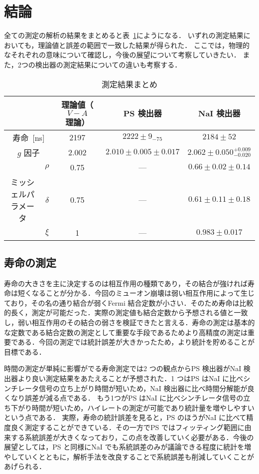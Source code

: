 \section{結論}
全ての測定の解析の結果をまとめると表~\ref{tab:result_conclusion}にようになる．
いずれの測定結果においても，理論値と誤差の範囲で一致した結果が得られた．
ここでは，物理的なそれぞれの意味について確認し，今後の展望について考察していきたい．
また，2つの検出器の測定結果についての違いも考察する．

\begin{table}[h]
\centering
\caption{測定結果まとめ}
\label{tab:result_conclusion}
\begin{tabular}{ccccc}\toprule
{} & {} & 理論値（$V-A$理論） & PS 検出器 & NaI 検出器\\ \midrule
\multicolumn{2}{c}{寿命~[ns]} &  2197 & $2222 \pm 9_{- 75}$ & $2184 \pm 52$\\
\multicolumn{2}{c}{$g$ 因子} & 2.002 & $2.010 \pm 0.005 \pm 0.017$ & $2.062 \pm 0.050^{+0.009}_{-0.020}$\\ %
{} & $\rho$ & 0.75 & --- & $0.66 \pm 0.02 \pm 0.14$\\
ミッシェルパラメータ & $\delta$ & 0.75 & --- & $0.61 \pm 0.11 \pm 0.18$\\
{} & $\xi$ & 1 & --- & $0.983 \pm 0.017$\\ \bottomrule
\end{tabular}
\end{table}%

\subsection{寿命の測定}
寿命の大きさを主に決定するのは相互作用の種類であり，その結合が強ければ寿命は短くなることが分かる．今回のミューオン崩壊は弱い相互作用によって生じており，その名の通り結合が弱くFermi 結合定数が小さい．そのため寿命は比較的長く，測定が可能だった．実際の測定値も結合定数から予想される値と一致し，弱い相互作用のその結合の弱さを検証できたと言える．寿命の測定は基本的な定数である結合定数の測定として重要な手段であるためより高精度の測定は重要である．今回の測定では統計誤差が大きかったため，より統計を貯めることが目標である．

時間の測定が単純に影響がでる寿命測定では2 つの観点からPS 検出器がNaI 検出器より良い測定結果をあたえることが予想された．1 つはPS はNaI に比べシンチレータ信号の立ち上がり時間が短いため，NaI 検出器に比べ時間分解能が良くなり誤差が減る点である．
もう1つがPS はNaI に比べシンチレータ信号の立ち下がり時間が短いため，ハイレートの測定が可能であり統計量を増やしやすいという点である．
実際，寿命の統計誤差を見ると，PS のほうがNaI に比べて精度良く測定することができている．その一方でPS ではフィッティング範囲に由来する系統誤差が大きくなっており，この点を改善していく必要がある．今後の展望としては，PS と同様にNaI でも系統誤差のみが議論できる程度に統計を増やしていくとともに，解析手法を改良することで系統誤差も削減していくことがあげられる．

